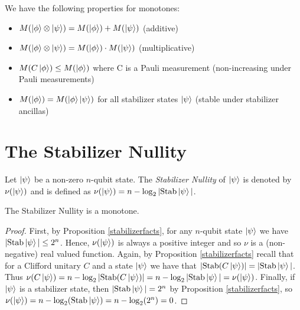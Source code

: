 \documentclass[12pt]{dalthesis}
\begin{document}
\begin{definition} 
We have the following properties for monotones:
\begin{itemize}
\item $M(\ket{\phi} \otimes \ket{\psi}) = M(\ket{\phi}) + M(\ket{\psi})$ (additive) 
\item $M(\ket{\phi} \otimes \ket{\psi}) = M(\ket{\phi}) \cdot M(\ket{\psi})$ (multiplicative)
\item $M(C\ket{\phi}) \leq M(\ket{\phi})$ where C is a Pauli measurement (non-increasing under Pauli measurements)
\item $M(\ket{\phi}) = M(\ket{\phi}\ket{\psi})$ for all stabilizer states $\ket{\psi}$ (stable under stabilizer ancillas)
\end{itemize}
\end{definition}

\section{The Stabilizer Nullity}

\begin{definition}
Let $\ket{\psi}$ be a non-zero $n$-qubit state. The \emph{Stabilizer Nullity} of $\ket{\psi}$ is denoted by $\nu(\ket{\psi})$ and is defined as $\nu(\ket{\psi}) = n - \log_2 |\text{Stab}\ket{\psi}|$.
\end{definition}

\begin{proposition}
The Stabilizer Nullity is a monotone.
\end{proposition}
\begin{proof}
First, by Proposition \ref{stabilizerfacts}, for any $n$-qubit state $\ket{\psi}$ we have $|\mathrm{Stab} \ket{\psi}| \leq 2^n$. Hence, $\nu (\ket{\psi})$ is always a positive integer and so $\nu$ is a (non-negative) real valued function. Again, by Proposition \ref{stabilizerfacts} recall that for a Clifford unitary $C$ and a state $\ket{\psi}$ we have that $|\mathrm{Stab}(C\ket{\psi})| = |\mathrm{Stab}\ket{\psi}|$. Thus $\nu(C\ket{\psi}) = n - \log_2|\mathrm{Stab}(C\ket{\psi})| = n - \log_2|\mathrm{Stab}\ket{\psi}| = \nu(\ket{\psi})$. Finally, if $\ket{\psi}$ is a stabilizer state, then $|\mathrm{Stab}\ket{\psi}| = 2^n$ by Proposition \ref{stabilizerfacts}, so $\nu(\ket{\psi}) = n - \log_2(\mathrm{Stab}\ket{\psi}) =  n - \log_2(2^n) = 0$. 
\end{proof}
\end{document}
